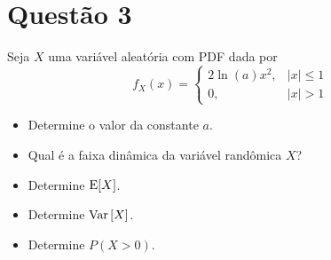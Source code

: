 \section{Questão 3}
Seja $X$ uma variável aleatória com PDF dada por
%
\begin{equation*}
    f_X(x) = 
    \begin{cases}
        2 \ln(a) x^2, & |x| \leq 1 \\
        0,            & |x| > 1
    \end{cases}
\end{equation*}

\begin{itemize}
    \item [a)] 
    Determine o valor da constante $a$.
    
    \item [b)] 
    Qual é a faixa dinâmica da variável randômica $X$?
    
    \item [c)] 
    Determine $\mathrm{E}\!\left[X\right]$.
    
    \item [d)] 
    Determine $\mathrm{Var}\left[X\right]$.
    
    \item [e)] 
    Determine $P(X > 0)$.
\end{itemize}

